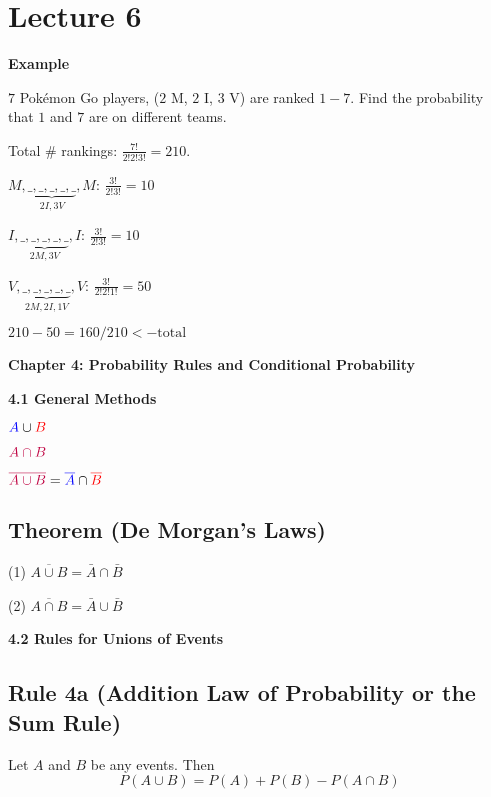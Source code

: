 \section{Lecture 6}
\textbf{Example}

$ 7 $ Pokémon Go players, ($ 2 $ M, $ 2 $ I, $ 3 $ V) are ranked $ 1-7 $.
Find the probability that $ 1 $ and $ 7 $ are on different teams.

Total \# rankings: $\frac{7!}{2!2!3!}=210$.

$ M,\underbrace{\_,\_,\_,\_,\_}_{2I,3V},M $: $ \frac{3!}{2!3!} =10 $

$ I,\underbrace{\_,\_,\_,\_,\_}_{2M,3V},I $: $ \frac{3!}{2!3!} =10 $

$ V,\underbrace{\_,\_,\_,\_,\_}_{2M,2I,1V},V $: $ \frac{3!}{2!2!1!}=50 $

$ 210-50=160/210<-\text{total} $

\textbf{\textbf{Chapter 4: Probability Rules and Conditional Probability}}

\textbf{4.1 General Methods}

$ {\color{blue} A}\cup {\color{red} B} $

\scalebox{0.5}{}

$ {\color{purple} A\cap B }$

\scalebox{0.5}{}

$ {\color{purple}\overline{A\cup B}}={\color{blue}\overline{A}}\cap {\color{red}\overline{B}} $

\scalebox{0.5}{}

\begin{thmbox}
    \subsection{Theorem (De Morgan's Laws)}
    (1) $\overline{A \cup B}=\bar{A}\cap \bar{B}$

    (2) $\overline{A \cap B}=\bar{A}\cup \bar{B}$
\end{thmbox}

\textbf{4.2 Rules for Unions of Events}

\begin{thmbox}
    \subsection{Rule 4a (Addition Law of Probability or the Sum Rule)}
    Let $ A $ and $ B $ be any events. Then
    \[ P(A\cup B)=P(A)+P(B)-P(A\cap B) \]
\end{thmbox}

